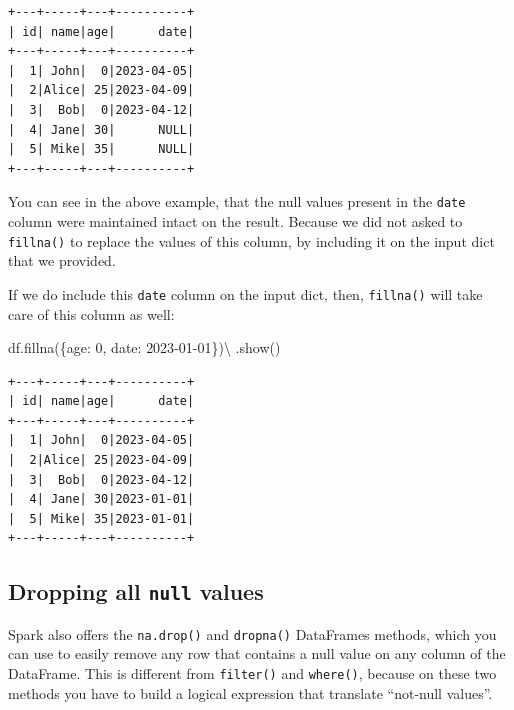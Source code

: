 \documentclass[
  11pt,
  letterpaper,
  DIV=11,
  numbers=noendperiod]{scrreprt}
\newenvironment{Shaded}{\begin{snugshade}}{\end{snugshade}}
\newcommand{\DecValTok}[1]{\textcolor[rgb]{0.68,0.00,0.00}{#1}}
\newcommand{\NormalTok}[1]{\textcolor[rgb]{0.00,0.23,0.31}{#1}}
\newcommand{\OperatorTok}[1]{\textcolor[rgb]{0.37,0.37,0.37}{#1}}
\newcommand{\StringTok}[1]{\textcolor[rgb]{0.13,0.47,0.30}{#1}}
\begin{document}
\begin{verbatim}
+---+-----+---+----------+
| id| name|age|      date|
+---+-----+---+----------+
|  1| John|  0|2023-04-05|
|  2|Alice| 25|2023-04-09|
|  3|  Bob|  0|2023-04-12|
|  4| Jane| 30|      NULL|
|  5| Mike| 35|      NULL|
+---+-----+---+----------+
\end{verbatim}

You can see in the above example, that the null values present in the
\texttt{date} column were maintained intact on the result. Because we
did not asked to \texttt{fillna()} to replace the values of this column,
by including it on the input dict that we provided.

If we do include this \texttt{date} column on the input dict, then,
\texttt{fillna()} will take care of this column as well:

\begin{Shaded}
\begin{Highlighting}[]
\NormalTok{df.fillna(\{}\StringTok{\textquotesingle{}age\textquotesingle{}}\NormalTok{: }\DecValTok{0}\NormalTok{, }\StringTok{\textquotesingle{}date\textquotesingle{}}\NormalTok{: }\StringTok{\textquotesingle{}2023{-}01{-}01\textquotesingle{}}\NormalTok{\})}\OperatorTok{\textbackslash{}}
\NormalTok{    .show()}
\end{Highlighting}
\end{Shaded}

\begin{verbatim}
+---+-----+---+----------+
| id| name|age|      date|
+---+-----+---+----------+
|  1| John|  0|2023-04-05|
|  2|Alice| 25|2023-04-09|
|  3|  Bob|  0|2023-04-12|
|  4| Jane| 30|2023-01-01|
|  5| Mike| 35|2023-01-01|
+---+-----+---+----------+
\end{verbatim}

\hypertarget{dropping-all-null-values}{%
\subsection{\texorpdfstring{Dropping all \texttt{null}
values}{Dropping all null values}}\label{dropping-all-null-values}}

Spark also offers the \texttt{na.drop()} and \texttt{dropna()}
DataFrames methods, which you can use to easily remove any row that
contains a null value on any column of the DataFrame. This is different
from \texttt{filter()} and \texttt{where()}, because on these two
methods you have to build a logical expression that translate ``not-null
values''.
\end{document}
